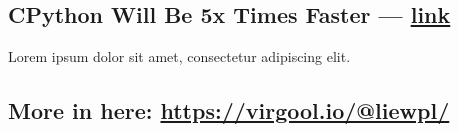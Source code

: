 \begin{multicols}{2}
\subsection{{CPython Will Be 5x Times Faster --- \href{https://virgool.io/@liewpl/cpython-five-times-faster-p5jve4zzywog}{link}}}
\begin{zitemize}
\item Lorem ipsum dolor sit amet, consectetur adipiscing elit.
\end{zitemize}

\subsection{{More in here: \href{https://virgool.io/@liewpl/}{https://virgool.io/@liewpl/}}}

\end{multicols}